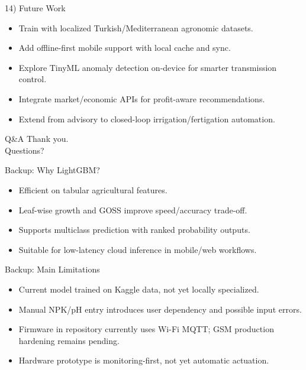 \documentclass[aspectratio=169]{beamer}
\begin{document}
\begin{frame}{14) Future Work}
  \begin{itemize}
    \item Train with localized Turkish/Mediterranean agronomic datasets.
    \item Add offline-first mobile support with local cache and sync.
    \item Explore TinyML anomaly detection on-device for smarter transmission control.
    \item Integrate market/economic APIs for profit-aware recommendations.
    \item Extend from advisory to closed-loop irrigation/fertigation automation.
  \end{itemize}
\end{frame}

\begin{frame}{Q\&A}
  \centering
  \Large Thank you.\\
  \vspace{1em}
  Questions?
\end{frame}

\begin{frame}{Backup: Why LightGBM?}
  \begin{itemize}
    \item Efficient on tabular agricultural features.
    \item Leaf-wise growth and GOSS improve speed/accuracy trade-off.
    \item Supports multiclass prediction with ranked probability outputs.
    \item Suitable for low-latency cloud inference in mobile/web workflows.
  \end{itemize}
\end{frame}

\begin{frame}{Backup: Main Limitations}
  \begin{itemize}
    \item Current model trained on Kaggle data, not yet locally specialized.
    \item Manual NPK/pH entry introduces user dependency and possible input errors.
    \item Firmware in repository currently uses Wi-Fi MQTT; GSM production hardening remains pending.
    \item Hardware prototype is monitoring-first, not yet automatic actuation.
  \end{itemize}
\end{frame}
\end{document}
